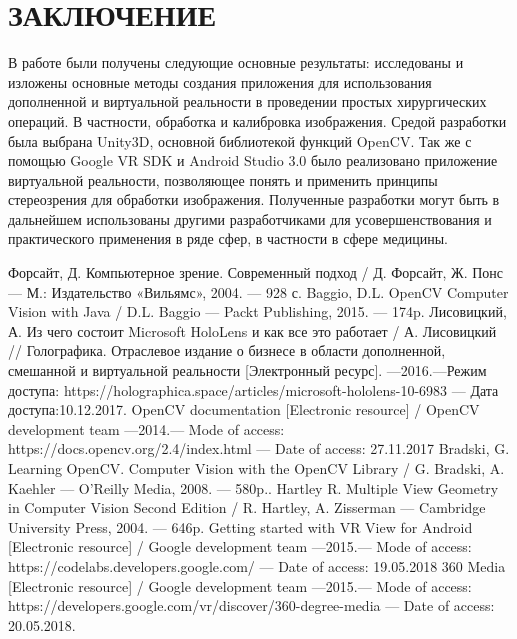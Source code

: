 \documentclass[a4paper, 14pt]{extreport} %
\begin{document}
\chapter*{ЗАКЛЮЧЕНИЕ} 

В работе были получены следующие основные результаты: исследованы и изложены основные методы создания приложения для использования дополненной и виртуальной реальности в проведении простых хирургических операций. В частности, обработка и калибровка изображения. Средой разработки была выбрана Unity3D, основной \cite{b8} библиотекой функций OpenCV. Так же с помощью Google VR SDK и Android Studio 3.0 было реализовано приложение виртуальной реальности, позволяющее понять и применить принципы стереозрения для обработки изображения. Полученные разработки могут быть в дальнейшем использованы другими разработчиками для усовершенствования и практического применения в ряде сфер, в частности в сфере медицины.
\newpage


\begin{thebibliography}{99}
	 Форсайт, Д. Компьютерное зрение. Современный подход / Д. Форсайт, Ж. Понс — М.: Издательство «Вильямс», 2004. — 928 с.
	 Baggio, D.L. OpenCV Computer Vision with Java / D.L. Baggio — Packt Publishing, 2015. — 174p.
	 Лисовицкий, А. Из чего состоит Microsoft HoloLens и как все это работает / А. Лисовицкий // Голографика. Отраслевое издание о бизнесе в области дополненной, смешанной и виртуальной реальности [Электронный ресурс]. —2016.—Режим доступа: https://holographica.space/articles/microsoft-hololens-10-6983  — Дата доступа:10.12.2017.
	 OpenCV documentation [Electronic resource] / OpenCV development team —2014.— Mode of access: https://docs.opencv.org/2.4/index.html  — Date of access: 27.11.2017
	 Bradski, G. Learning OpenCV. Computer Vision with the OpenCV Library / G. Bradski, A. Kaehler — O'Reilly Media, 2008. — 580p..
	 Hartley R. Multiple View Geometry in Computer Vision Second Edition / R. Hartley, A. Zisserman — Cambridge University Press, 2004. — 646p.
	 Getting started with VR View for Android [Electronic resource] / Google development team —2015.— Mode of access: https://codelabs.developers.google.com/  — Date of access: 19.05.2018
	 360 Media [Electronic resource] / Google development team —2015.— Mode of access: https://developers.google.com/vr/discover/360-degree-media  — Date of access: 20.05.2018.
\end{thebibliography}
\end{document}
